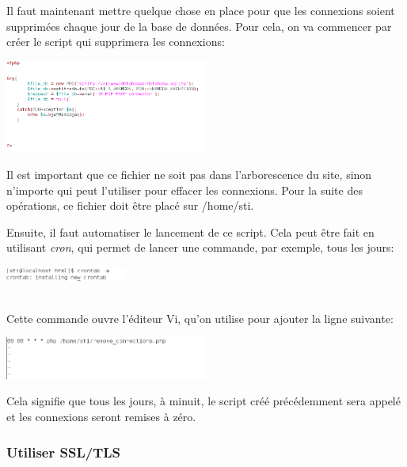 \documentclass{article}
\begin{document}
Il faut maintenant mettre quelque chose en place pour que les connexions
soient supprimées chaque jour de la base de données. Pour cela, on va
commencer par créer le script qui supprimera les connexions:

\begin{center}\includegraphics[width=0.5\textwidth]{images/tentative_remove_connection.PNG}\end{center}

Il est important que ce fichier ne soit pas dans l'arborescence du site,
sinon n'importe qui peut l'utiliser pour effacer les connexions. Pour la
suite des opérations, ce fichier doit être placé sur /home/sti.

Ensuite, il faut automatiser le lancement de ce script. Cela peut être
fait en utilisant \emph{cron}, qui permet de lancer une commande, par
exemple, tous les jours:\\

\begin{center}\includegraphics[width=0.3\textwidth]{images/tentative_crontab.PNG}\end{center}\\

Cette commande ouvre l'éditeur Vi, qu'on utilise pour ajouter la ligne
suivante:\\

\begin{center}\includegraphics[width=0.5\textwidth]{images/tentative_crontab_detail.PNG}\end{center}

Cela signifie que tous les jours, à minuit, le script créé précédemment
sera appelé et les connexions seront remises à zéro.

\subsubsection{Utiliser SSL/TLS}
\end{document}
